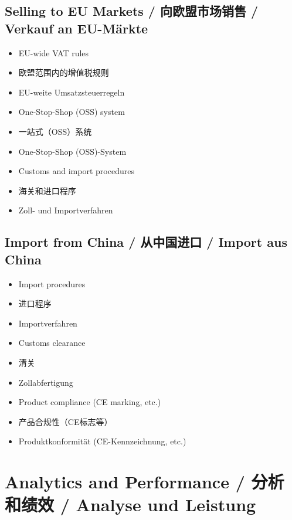 \subsection{Selling to EU Markets / 向欧盟市场销售 / Verkauf an EU-Märkte}
\begin{itemize}
    \item EU-wide VAT rules
    \item 欧盟范围内的增值税规则
    \item EU-weite Umsatzsteuerregeln
    \item One-Stop-Shop (OSS) system
    \item 一站式（OSS）系统
    \item One-Stop-Shop (OSS)-System
    \item Customs and import procedures
    \item 海关和进口程序
    \item Zoll- und Importverfahren
\end{itemize}

\subsection{Import from China / 从中国进口 / Import aus China}
\begin{itemize}
    \item Import procedures
    \item 进口程序
    \item Importverfahren
    \item Customs clearance
    \item 清关
    \item Zollabfertigung
    \item Product compliance (CE marking, etc.)
    \item 产品合规性（CE标志等）
    \item Produktkonformität (CE-Kennzeichnung, etc.)
\end{itemize}

\section{Analytics and Performance / 分析和绩效 / Analyse und Leistung}

